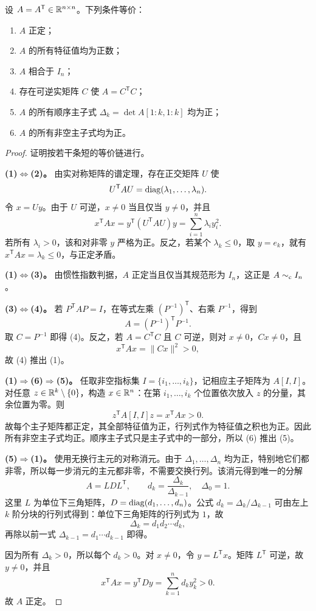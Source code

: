 \begin{theorem}[正定矩阵的常用等价条件]
设 $A=A^{\mathsf T}\in\mathbb{R}^{n\times n}$。下列条件等价：
\begin{enumerate}
\item $A$ 正定；
\item $A$ 的所有特征值均为正数；
\item $A$ 相合于 $I_n$；
\item 存在可逆实矩阵 $C$ 使 $A=C^{\mathsf T}C$；
\item $A$ 的所有顺序主子式 $\Delta_k=\det A[1{:}k,1{:}k]$ 均为正；
\item $A$ 的所有非空主子式均为正。
\end{enumerate}
\end{theorem}
\begin{proof}
证明按若干条短的等价链进行。

\textbf{(1)$\Longleftrightarrow$(2)。} 由实对称矩阵的谱定理，存在正交矩阵 $U$ 使
\[
U^{\mathsf T}AU=\operatorname{diag}(\lambda_1,\ldots,\lambda_n).
\]
令 $x=Uy$。由于 $U$ 可逆，$x\ne0$ 当且仅当 $y\ne0$，并且
\[
x^{\mathsf T}Ax=y^{\mathsf T}(U^{\mathsf T}AU)y
=\sum_{i=1}^n\lambda_i y_i^2.
\]
若所有 $\lambda_i>0$，该和对非零 $y$ 严格为正。反之，若某个 $\lambda_k\le0$，取 $y=e_k$，就有 $x^{\mathsf T}Ax=\lambda_k\le0$，与正定矛盾。

\textbf{(1)$\Longleftrightarrow$(3)。} 由惯性指数判据，$A$ 正定当且仅当其规范形为 $I_n$，这正是 $A\sim_{\mathrm c} I_n$。

\textbf{(3)$\Longleftrightarrow$(4)。} 若 $P^{\mathsf T}AP=I$，在等式左乘 $(P^{-1})^{\mathsf T}$、右乘 $P^{-1}$，得到
\[
A=(P^{-1})^{\mathsf T}P^{-1}.
\]
取 $C=P^{-1}$ 即得 (4)。反之，若 $A=C^{\mathsf T}C$ 且 $C$ 可逆，则对 $x\ne0$，$Cx\ne0$，且
\[
x^{\mathsf T}Ax=\lVert Cx\rVert^2>0,
\]
故 (4) 推出 (1)。

\textbf{(1)$\Longrightarrow$(6)$\Longrightarrow$(5)。} 任取非空指标集 $I=\{i_1,\ldots,i_k\}$，记相应主子矩阵为 $A[I,I]$。对任意 $z\in\mathbb{R}^k\setminus\{0\}$，构造 $x\in\mathbb{R}^n$：在第 $i_1,\ldots,i_k$ 个位置依次放入 $z$ 的分量，其余位置为零。则
\[
z^{\mathsf T}A[I,I]z=x^{\mathsf T}Ax>0.
\]
故每个主子矩阵都正定，其全部特征值为正，行列式作为特征值之积也为正。因此所有非空主子式均正。顺序主子式只是主子式中的一部分，所以 (6) 推出 (5)。

\textbf{(5)$\Longrightarrow$(1)。} 使用无换行主元的对称消元。由于 $\Delta_1,\ldots,\Delta_n$ 均为正，特别地它们都非零，所以每一步消元的主元都非零，不需要交换行列。该消元得到唯一的分解
\[
A=LDL^{\mathsf T},\qquad d_k=\frac{\Delta_k}{\Delta_{k-1}},\quad \Delta_0=1.
\]
这里 $L$ 为单位下三角矩阵，$D=\operatorname{diag}(d_1,\ldots,d_n)$。公式 $d_k=\Delta_k/\Delta_{k-1}$ 可由左上 $k$ 阶分块的行列式得到：单位下三角矩阵的行列式为 $1$，故
\[
\Delta_k=d_1d_2\cdots d_k,
\]
再除以前一式 $\Delta_{k-1}=d_1\cdots d_{k-1}$ 即得。

因为所有 $\Delta_k>0$，所以每个 $d_k>0$。对 $x\ne0$，令 $y=L^{\mathsf T}x$。矩阵 $L^{\mathsf T}$ 可逆，故 $y\ne0$，并且
\[
x^{\mathsf T}Ax=y^{\mathsf T}Dy=\sum_{k=1}^n d_ky_k^2>0.
\]
故 $A$ 正定。
\end{proof}

